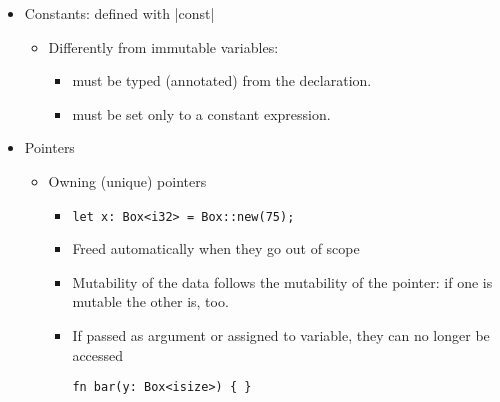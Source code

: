 \documentclass[a4paper,12pt,%
              final%
              ]{article}
\begin{document}
\begin{itemize}
\begin{itemize}
    \end{itemize}
  \item Constants: defined with |const|
    \begin{itemize}
      \item Differently from immutable variables:
        \begin{itemize}
          \item must be typed (annotated) from the declaration.
          \item must be set only to a constant expression.
        \end{itemize}
    \end{itemize}
  \item Pointers
    \begin{itemize}
      \item Owning (unique) pointers
        \begin{itemize}
          \item \verb|let x: Box<i32> = Box::new(75);|
          \item Freed automatically when they go out of scope
          \item Mutability of the data follows the mutability of the pointer: if one is mutable the other is, too.
          \item If passed as argument or assigned to variable, they can no longer be accessed
\begin{verbatim}
fn bar(y: Box<isize>) { }


\end{verbatim}
\end{itemize}
\end{itemize}
\end{itemize}
\end{document}
